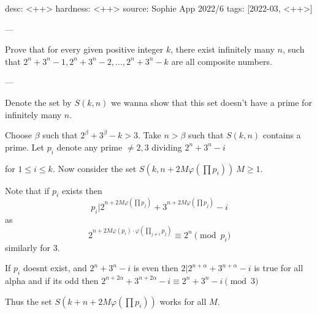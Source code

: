 desc: <++>
hardness: <++>
source: Sophie App 2022/6
tags: [2022-03, <++>]

---

Prove that for every given positive integer $k$, there exist infinitely 
many $n$, such that $2^n + 3^n - 1, 2^n + 3^n -2, \dots, 2^n + 3^n - k$ are all composite numbers.

---

Denote the set by $S(k,n)$ we wanna show that this set doesn't have a prime for infinitely many $n$.

Choose $\beta$ such that $2^\beta + 3^\beta - k > 3$.
Take $n > \beta$ such that $S(k,n)$ contains a prime.
Let $p_i$ denote any prime $\neq 2,3$ dividing $2^n + 3^n - i$

for $1 \leq i \leq k$. Now consider the set $S(k,n+2M\varphi(\prod p_i)) \ M \geq 1$.

Note that if $p_i$ exists then $$p_i | 2^{n+2M\varphi(\prod p_j)} + 3^{n+2M\varphi(\prod p_j)} - i$$ as 
$$2^{n+2M\varphi(p_i) \cdot \varphi(\prod_{j \neq i} p_j)} \equiv 2^n \pmod{p_i}$$ similarly for $3$.

If $p_i$ doesnt exist, and $2^n + 3^n - i$ is even then $2|2^{n+\alpha} + 3^{n+\alpha} -i$ is true for all alpha
and if its odd then $2^{n + 2\alpha} + 3^{n + 2\alpha} - i \equiv 2^n + 3^n - i \pmod{3}$

Thus the set $S(k+n+2M\varphi(\prod p_i))$ works for all $M$. 
